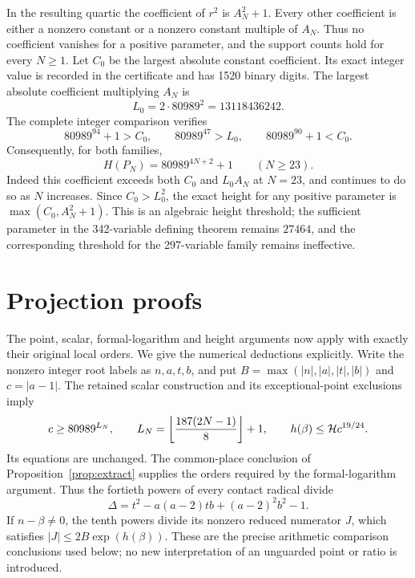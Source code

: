 \documentclass[11pt,a4paper]{article}
\theoremstyle{remark}\newtheorem{remark}[theorem]{Remark}
\begin{document}
In the resulting quartic the coefficient of $r^2$ is $A_N^2+1$.
Every other coefficient is either a nonzero constant or a nonzero constant
multiple of $A_N$. Thus no coefficient vanishes for a positive parameter,
and the support counts hold for every $N\ge1$.
Let $C_0$ be the largest absolute constant coefficient. Its exact integer
value is recorded in the certificate and has 1520 binary digits. The
largest absolute coefficient multiplying $A_N$ is
\[
                       L_0=2\cdot80989^2=13118436242.
\]
The complete integer comparison verifies
\[
 80989^{94}+1>C_0,\qquad80989^{47}>L_0,
 \qquad80989^{90}+1<C_0.
\]
Consequently, for both families,
\[
                        H(P_N)=80989^{4N+2}+1
                        \qquad(N\ge23).
\]
Indeed this coefficient exceeds both $C_0$ and $L_0A_N$ at $N=23$,
and continues to do so as $N$ increases. Since $C_0>L_0^2$, the exact
height for any positive parameter is $\max(C_0,A_N^2+1)$.
This is an algebraic height threshold; the sufficient parameter in the
342-variable defining theorem remains $27464$, and the corresponding
threshold for the 297-variable family remains ineffective.

\section{Projection proofs}
The point, scalar, formal-logarithm and height arguments now apply with
exactly their original local orders. We give the numerical deductions
explicitly. Write the nonzero integer root labels as $n,a,t,b$, and put
$B=\max(|n|,|a|,|t|,|b|)$ and $c=|a-1|$. The retained scalar construction
and its exceptional-point exclusions imply
\[
 c\ge80989^{L_N},\qquad L_N=\left\lfloor\frac{187(2N-1)}8\right\rfloor+1,
 \qquad h(\beta)\le\mathcal H c^{19/24}.
\]
Its equations are unchanged. The common-place conclusion of
Proposition~\ref{prop:extract} supplies the orders required by the
formal-logarithm argument. Thus the fortieth powers of every contact
radical divide
\[
 \Delta=t^2-a(a-2)tb+(a-2)^2b^2-1.
\]
If $n-\beta\ne0$, the tenth powers divide its nonzero reduced numerator
$J$, which satisfies $|J|\le2B\exp(h(\beta))$. These are the precise
arithmetic comparison conclusions used below; no new interpretation of
an unguarded point or ratio is introduced.
\end{document}

